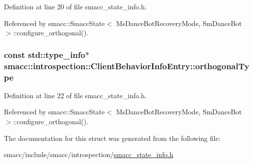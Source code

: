 Definition at line 20 of file smacc\+\_\+state\+\_\+info.\+h.



Referenced by smacc\+::\+Smacc\+State$<$ Ms\+Dance\+Bot\+Recovery\+Mode, Sm\+Dance\+Bot $>$\+::configure\+\_\+orthogonal().

\subsubsection[{\texorpdfstring{orthogonal\+Type}{orthogonalType}}]{\setlength{\rightskip}{0pt plus 5cm}const std\+::type\+\_\+info$\ast$ smacc\+::introspection\+::\+Client\+Behavior\+Info\+Entry\+::orthogonal\+Type}\hypertarget{structsmacc_1_1introspection_1_1ClientBehaviorInfoEntry_aabffb57e6ee723ce1b2bdb6ad30c6993}{}\label{structsmacc_1_1introspection_1_1ClientBehaviorInfoEntry_aabffb57e6ee723ce1b2bdb6ad30c6993}


Definition at line 22 of file smacc\+\_\+state\+\_\+info.\+h.



Referenced by smacc\+::\+Smacc\+State$<$ Ms\+Dance\+Bot\+Recovery\+Mode, Sm\+Dance\+Bot $>$\+::configure\+\_\+orthogonal().



The documentation for this struct was generated from the following file\+:\begin{DoxyCompactItemize}
\item 
smacc/include/smacc/introspection/\hyperlink{smacc__state__info_8h}{smacc\+\_\+state\+\_\+info.\+h}\end{DoxyCompactItemize}
